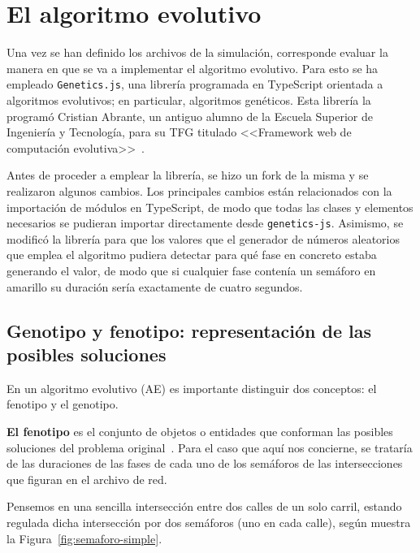 \section{El algoritmo evolutivo}

Una vez se han definido los archivos de la simulación, corresponde evaluar la manera en que se va a implementar el algoritmo evolutivo. Para esto se ha empleado \texttt{Genetics.js}, una librería programada en TypeScript orientada a algoritmos evolutivos; en particular, algoritmos genéticos. Esta librería la programó Cristian Abrante, un antiguo alumno de la Escuela Superior de Ingeniería y Tecnología, para su TFG titulado <<Framework web de computación evolutiva>>~\cite{abrante_dorta_framework_2019}. 

Antes de proceder a emplear la librería, se hizo un fork de la misma y se realizaron algunos cambios. Los principales cambios están relacionados con la importación de módulos en TypeScript, de modo que todas las clases y elementos necesarios se pudieran importar directamente desde \texttt{genetics-js}. Asimismo, se modificó la librería para que los valores que el generador de números aleatorios que emplea el algoritmo pudiera detectar para qué fase en concreto estaba generando el valor, de modo que si cualquier fase contenía un semáforo en amarillo su duración sería exactamente de cuatro segundos.

\subsection{Genotipo y fenotipo: representación de las posibles soluciones}

En un algoritmo evolutivo (AE) es importante distinguir dos conceptos: el fenotipo y el genotipo.

\textbf{El fenotipo} es el conjunto de objetos o entidades que conforman las posibles soluciones del problema original~\cite{eiben_introduction_2003}. Para el caso que aquí nos concierne, se trataría de las duraciones de las fases de cada uno de los semáforos de las intersecciones que figuran en el archivo de red.

Pensemos en una sencilla intersección entre dos calles de un solo carril, estando regulada dicha intersección por dos semáforos (uno en cada calle), según muestra la Figura~\ref{fig:semaforo-simple}.

